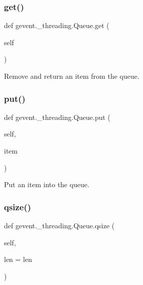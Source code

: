 \subsubsection{\texorpdfstring{get()}{get()}}
{\footnotesize\ttfamily def gevent.\+\_\+threading.\+Queue.\+get (\begin{DoxyParamCaption}\item[{}]{self }\end{DoxyParamCaption})}

\begin{DoxyVerb}Remove and return an item from the queue.
\end{DoxyVerb}
 \mbox{\label{classgevent_1_1__threading_1_1_queue_aefbf185463e87620fab548b6b7865d60}} 
\subsubsection{\texorpdfstring{put()}{put()}}
{\footnotesize\ttfamily def gevent.\+\_\+threading.\+Queue.\+put (\begin{DoxyParamCaption}\item[{}]{self,  }\item[{}]{item }\end{DoxyParamCaption})}

\begin{DoxyVerb}Put an item into the queue.
\end{DoxyVerb}
 \mbox{\label{classgevent_1_1__threading_1_1_queue_a74699231ed7c72d44dcb373908ad7af8}} 
\subsubsection{\texorpdfstring{qsize()}{qsize()}}
{\footnotesize\ttfamily def gevent.\+\_\+threading.\+Queue.\+qsize (\begin{DoxyParamCaption}\item[{}]{self,  }\item[{}]{len = {\ttfamily len} }\end{DoxyParamCaption})}


